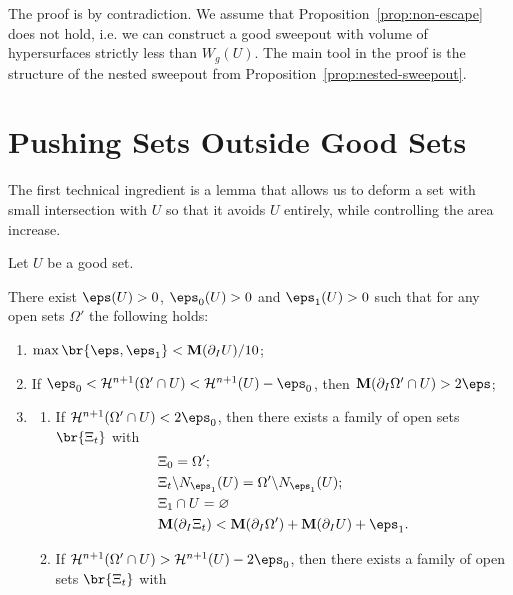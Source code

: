 The proof is by contradiction. We assume that Proposition~\ref{prop:non-escape} does not hold, i.e. we can construct a good sweepout with volume of hypersurfaces strictly less than $W_g(U)$. The main tool in the proof is the structure of the nested sweepout from Proposition~\ref{prop:nested-sweepout}.

\section{Pushing Sets Outside Good Sets}\label{sec:pushing-outside}

The first technical ingredient is a lemma that allows us to deform a set with small intersection with $U$ so that it avoids $U$ entirely, while controlling the area increase.

Let $U$ be a good set.
\begin{lemma}\label{lem:nested-sweepout-small-intersection}
    There exist $\eps(U) > 0$, $\eps_0(U) > 0$ and $\eps_1(U) > 0$ such that for any open sets $\Omega'$ the following holds:
    \begin{enumerate}
        \item $\max\br{\eps, \eps_1} < \mathbf{M}(\partial_IU)/10$;
        \item If $\eps_0 < \mathcal{H}^{n+1}(\Omega'\cap U) < \mathcal{H}^{n+1}(U) - \eps_0$, then $\mathbf{M}(\partial_I\Omega'\cap U) > 2\eps$;
        \item 
        \begin{enumerate}
            \item[(A)] If $\mathcal{H}^{n+1}(\Omega'\cap U) < 2\eps_0$, then there exists a family of open sets $\br{\Xi_t}$ with 
            \begin{equation*}
                \begin{split}
                    &\Xi_0 = \Omega';\\
                    &\Xi_t\backslash N_{\eps_1}(U) = \Omega'\backslash N_{\eps_1}(U);\\
                    &\Xi_1\cap U = \varnothing\\
                    &\mathbf{M}(\partial_I\Xi_t) < \mathbf{M}(\partial_I\Omega') + \mathbf{M}(\partial_IU) + \eps_1.
                \end{split}
            \end{equation*}
            \item[(B)] If $\mathcal{H}^{n+1}(\Omega'\cap U) > \mathcal{H}^{n+1}(U) - 2\eps_0$, then there exists a family of open sets $\br{\Xi_t}$ with

\end{enumerate}
\end{enumerate}
\end{lemma}
